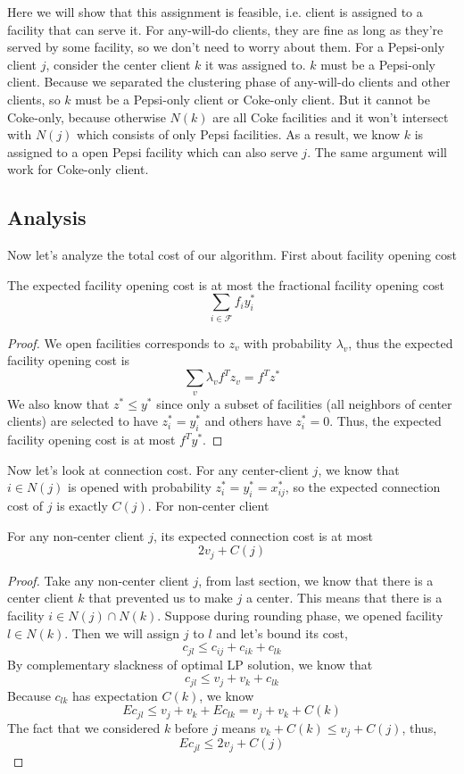Here we will show that this assignment is feasible, i.e. client is assigned to a facility that can serve it.
For any-will-do clients, they are fine as long as they're served by some facility, so we don't need to worry about them.
For a Pepsi-only client $j$, consider the center client $k$ it was assigned to.
$k$ must be a Pepsi-only client. Because we separated the clustering phase of any-will-do clients
and other clients, so $k$ must be a Pepsi-only client or Coke-only client.
But it cannot be Coke-only, because otherwise $N(k)$ are all Coke facilities and it won't intersect with
$N(j)$ which consists of only Pepsi facilities.
As a result, we know $k$ is assigned to a open Pepsi facility which can also serve $j$.
The same argument will work for Coke-only client.


\subsection{Analysis}

Now let's analyze the total cost of our algorithm. First about facility opening cost

\begin{lem}
The expected facility opening cost is at most the fractional facility opening cost
\[  \sum_{i \in \mathcal{F}} f_i y^*_i  \]
\end{lem}
\begin{proof}
We open facilities corresponds to $z_v$ with probability $\lambda_v$,
thus the expected facility opening cost is
\[  \sum_v \lambda_v f^T z_v = f^T z^*  \]
We also know that $z^* \le y^*$ since only a subset of facilities (all neighbors of center clients)
are selected to have $z^*_i = y^*_i$ and others have $z^*_i = 0$. Thus,
the expected facility opening cost is at most $f^T y^*$.
\end{proof}

Now let's look at connection cost. For any center-client $j$,
we know that $i \in N(j)$ is opened with probability $z^*_i = y^*_i = x^*_{ij}$,
so the expected connection cost of $j$ is exactly $C(j)$. For non-center client

\begin{lem}
For any non-center client $j$, its expected connection cost is at most
\[  2 v_j + C(j)    \]
\end{lem}
\begin{proof}
Take any non-center client $j$, from last section, we know that there is a center client $k$
that prevented us to make $j$ a center. This means that there is a facility $i \in N(j) \cap N(k)$.
Suppose during rounding phase, we opened facility $l \in N(k)$. Then we will assign $j$ to $l$ and let's bound its cost,
\[  c_{jl} \le c_{ij} + c_{ik} + c_{lk}\]
By complementary slackness of optimal LP solution, we know that
\[  c_{jl} \le v_j + v_k + c_{lk}   \]
Because $c_{lk}$ has expectation $C(k)$, we know
\[  E c_{jl} \le v_j + v_k + E c_{lk} = v_j + v_k + C(k)    \]
The fact that we considered $k$ before $j$ means $v_k + C(k) \le v_j + C(j)$, thus,
\[  E c_{jl} \le 2v_j + C(j)    \]
\end{proof}


